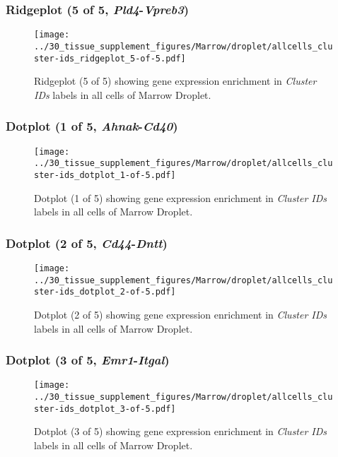 \clearpage

\subsubsection{Ridgeplot (5 of 5, \emph{Pld4}-\emph{Vpreb3})}
\begin{figure}[h]
\centering
\texttt{[image: ../30\_tissue\_supplement\_figures/Marrow/droplet/allcells\_cluster-ids\_ridgeplot\_5-of-5.pdf]}

\caption{ Ridgeplot (5 of 5)  showing gene expression enrichment in \emph{Cluster IDs} labels in all cells of Marrow Droplet. }
\end{figure}


\clearpage

\subsubsection{Dotplot (1 of 5, \emph{Ahnak}-\emph{Cd40})}
\begin{figure}[h]
\centering
\texttt{[image: ../30\_tissue\_supplement\_figures/Marrow/droplet/allcells\_cluster-ids\_dotplot\_1-of-5.pdf]}

\caption{ Dotplot (1 of 5)  showing gene expression enrichment in \emph{Cluster IDs} labels in all cells of Marrow Droplet. }
\end{figure}


\clearpage

\subsubsection{Dotplot (2 of 5, \emph{Cd44}-\emph{Dntt})}
\begin{figure}[h]
\centering
\texttt{[image: ../30\_tissue\_supplement\_figures/Marrow/droplet/allcells\_cluster-ids\_dotplot\_2-of-5.pdf]}

\caption{ Dotplot (2 of 5)  showing gene expression enrichment in \emph{Cluster IDs} labels in all cells of Marrow Droplet. }
\end{figure}


\clearpage

\subsubsection{Dotplot (3 of 5, \emph{Emr1}-\emph{Itgal})}
\begin{figure}[h]
\centering
\texttt{[image: ../30\_tissue\_supplement\_figures/Marrow/droplet/allcells\_cluster-ids\_dotplot\_3-of-5.pdf]}

\caption{ Dotplot (3 of 5)  showing gene expression enrichment in \emph{Cluster IDs} labels in all cells of Marrow Droplet. }
\end{figure}


